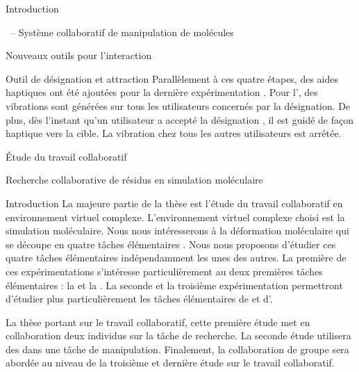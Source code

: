 \documentclass[myfrancais]{mythesis}
\begin{document}
\begin{mypart}{Introduction}
\begin{mychapter}{\myShaddock\ -- Système collaboratif de manipulation de molécules}
\begin{mysection}{Nouveaux outils pour l'interaction}
\begin{mysubsection}{Outil de désignation et attraction}
					Parallèlement à ces quatre étapes, des aides haptiques ont été ajoutées pour la dernière expérimentation .
					Pour l', des vibrations sont générées sur tous les utilisateurs concernés par la désignation.
					De plus, dès l'instant qu'un utilisateur a accepté la désignation , il est guidé de façon haptique vers la cible.
					La vibration chez tous les autres utilisateurs est arrêtée.
				\end{mysubsection}
			\end{mysection}
		\end{mychapter}
	\end{mypart}
	\begin{mypart}{Étude du travail collaboratif}
		\begin{mychapter}{Recherche collaborative de résidus en simulation moléculaire}
			\begin{mysection}{Introduction}
				La majeure partie de la thèse est l'étude du travail collaboratif en environnement virtuel complexe.
				L'environnement virtuel complexe choisi est la simulation moléculaire.
				Nous nous intéresserons à la déformation moléculaire qui se découpe en quatre tâches élémentaires .
				Nous nous proposons d'étudier ces quatre tâches élémentaires indépendamment les unes des autres.
				La première de ces expérimentations s'intéresse particulièrement au deux premières tâches élémentaires : la  et la .
				La seconde et la troisième expérimentation permettront d'étudier plus particulièrement les tâches élémentaires de  et d'.

				La thèse portant sur le travail collaboratif, cette première étude met en collaboration deux individus sur la tâche de recherche.
				La seconde étude utilisera des  dans une tâche de manipulation.
				Finalement, la collaboration de groupe sera abordée au niveau de la troisième et dernière étude sur le travail collaboratif.


\end{mysection}
\end{mychapter}
\end{mypart}
\end{document}
